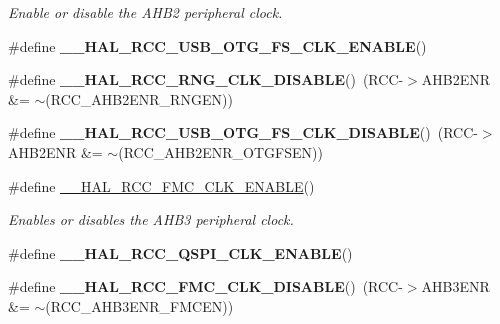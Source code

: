 \begin{DoxyCompactItemize}
\begin{DoxyCompactList}\small\item\em Enable or disable the A\+H\+B2 peripheral clock. \end{DoxyCompactList}\item 
\#define {\bfseries \+\_\+\+\_\+\+H\+A\+L\+\_\+\+R\+C\+C\+\_\+\+U\+S\+B\+\_\+\+O\+T\+G\+\_\+\+F\+S\+\_\+\+C\+L\+K\+\_\+\+E\+N\+A\+B\+LE}()
\item 
\mbox{\label{group___r_c_c_ex___peripheral___clock___enable___disable_ga8f885339c99130e538e4d7474933d470}} 
\#define {\bfseries \+\_\+\+\_\+\+H\+A\+L\+\_\+\+R\+C\+C\+\_\+\+R\+N\+G\+\_\+\+C\+L\+K\+\_\+\+D\+I\+S\+A\+B\+LE}()~(R\+CC-\/$>$A\+H\+B2\+E\+NR \&= $\sim$(R\+C\+C\+\_\+\+A\+H\+B2\+E\+N\+R\+\_\+\+R\+N\+G\+EN))
\item 
\mbox{\label{group___r_c_c_ex___peripheral___clock___enable___disable_ga2564a1cc04e854a0aa895416f11e32a6}} 
\#define {\bfseries \+\_\+\+\_\+\+H\+A\+L\+\_\+\+R\+C\+C\+\_\+\+U\+S\+B\+\_\+\+O\+T\+G\+\_\+\+F\+S\+\_\+\+C\+L\+K\+\_\+\+D\+I\+S\+A\+B\+LE}()~(R\+CC-\/$>$A\+H\+B2\+E\+NR \&= $\sim$(R\+C\+C\+\_\+\+A\+H\+B2\+E\+N\+R\+\_\+\+O\+T\+G\+F\+S\+EN))
\item 
\#define \mbox{\hyperlink{group___r_c_c_ex___peripheral___clock___enable___disable_ga4f95da0bcb204e40ca556b27290a7541}{\+\_\+\+\_\+\+H\+A\+L\+\_\+\+R\+C\+C\+\_\+\+F\+M\+C\+\_\+\+C\+L\+K\+\_\+\+E\+N\+A\+B\+LE}}()
\begin{DoxyCompactList}\small\item\em Enables or disables the A\+H\+B3 peripheral clock. \end{DoxyCompactList}\item 
\#define {\bfseries \+\_\+\+\_\+\+H\+A\+L\+\_\+\+R\+C\+C\+\_\+\+Q\+S\+P\+I\+\_\+\+C\+L\+K\+\_\+\+E\+N\+A\+B\+LE}()
\item 
\mbox{\label{group___r_c_c_ex___peripheral___clock___enable___disable_ga96dffcf5a982b89e776d0011e2904c28}} 
\#define {\bfseries \+\_\+\+\_\+\+H\+A\+L\+\_\+\+R\+C\+C\+\_\+\+F\+M\+C\+\_\+\+C\+L\+K\+\_\+\+D\+I\+S\+A\+B\+LE}()~(R\+CC-\/$>$A\+H\+B3\+E\+NR \&= $\sim$(R\+C\+C\+\_\+\+A\+H\+B3\+E\+N\+R\+\_\+\+F\+M\+C\+EN))
\item 
\mbox{\label{group___r_c_c_ex___peripheral___clock___enable___disable_gabea7af5741c00891980da84022e945c0}} 

\end{DoxyCompactItemize}
